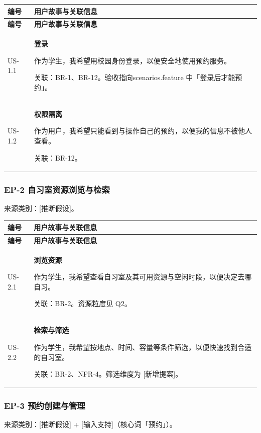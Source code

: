 \documentclass[11pt,a4paper]{article}
\begin{document}
\begin{longtable}{@{}p{}p{}@{}}
    \toprule
    \textbf{编号} & \textbf{用户故事与关联信息} \\
    \midrule
    \endfirsthead
    \toprule
    \textbf{编号} & \textbf{用户故事与关联信息} \\
    \midrule
    \endhead
    \bottomrule
    \endlastfoot
    US-1.1 & \textbf{登录}\par 作为学生，我希望用校园身份登录，以便安全地使用预约服务。\par {\small 关联：BR-1、BR-12。验收指向scenarios.feature 中「登录后才能预约」。} \\
    \midrule
    US-1.2 & \textbf{权限隔离}\par 作为用户，我希望只能看到与操作自己的预约，以便我的信息不被他人查看。\par {\small 关联：BR-12。} \\
\end{longtable}

\subsubsection{EP-2 自习室资源浏览与检索}
来源类别：[推断假设]。

\begin{longtable}{@{}p{}p{}@{}}
    \toprule
    \textbf{编号} & \textbf{用户故事与关联信息} \\
    \midrule
    \endfirsthead
    \toprule
    \textbf{编号} & \textbf{用户故事与关联信息} \\
    \midrule
    \endhead
    \bottomrule
    \endlastfoot
    US-2.1 & \textbf{浏览资源}\par 作为学生，我希望查看自习室及其可用资源与空闲时段，以便决定去哪自习。\par {\small 关联：BR-2。资源粒度见 Q2。} \\
    \midrule
    US-2.2 & \textbf{检索与筛选}\par 作为学生，我希望按地点、时间、容量等条件筛选，以便快速找到合适的自习室。\par {\small 关联：BR-2、NFR-4。筛选维度为 [新增提案]。} \\
\end{longtable}

\subsubsection{EP-3 预约创建与管理}
来源类别：[推断假设] + [输入支持]（核心词「预约」）。
\end{document}

